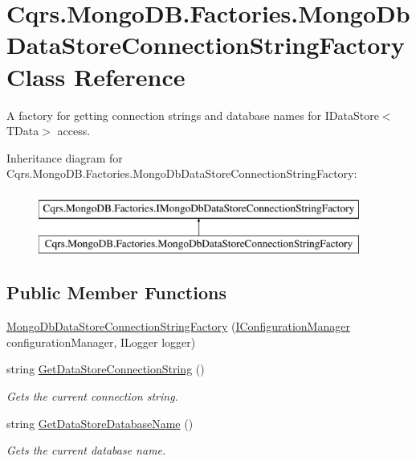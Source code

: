 \hypertarget{classCqrs_1_1MongoDB_1_1Factories_1_1MongoDbDataStoreConnectionStringFactory}{}\section{Cqrs.\+Mongo\+D\+B.\+Factories.\+Mongo\+Db\+Data\+Store\+Connection\+String\+Factory Class Reference}
\label{classCqrs_1_1MongoDB_1_1Factories_1_1MongoDbDataStoreConnectionStringFactory}


A factory for getting connection strings and database names for I\+Data\+Store$<$\+T\+Data$>$ access.  


Inheritance diagram for Cqrs.\+Mongo\+D\+B.\+Factories.\+Mongo\+Db\+Data\+Store\+Connection\+String\+Factory\+:\begin{figure}[H]
\begin{center}
\leavevmode
\includegraphics[height=2.000000cm]{classCqrs_1_1MongoDB_1_1Factories_1_1MongoDbDataStoreConnectionStringFactory}
\end{center}
\end{figure}
\subsection*{Public Member Functions}
\begin{DoxyCompactItemize}
\item 
\hyperlink{classCqrs_1_1MongoDB_1_1Factories_1_1MongoDbDataStoreConnectionStringFactory_a9ccb753772ee1aa374ad39ba5b93700f_a9ccb753772ee1aa374ad39ba5b93700f}{Mongo\+Db\+Data\+Store\+Connection\+String\+Factory} (\hyperlink{interfaceCqrs_1_1Configuration_1_1IConfigurationManager}{I\+Configuration\+Manager} configuration\+Manager, I\+Logger logger)
\item 
string \hyperlink{classCqrs_1_1MongoDB_1_1Factories_1_1MongoDbDataStoreConnectionStringFactory_a76986fcc9521c87bfbb6e417ef13cd53_a76986fcc9521c87bfbb6e417ef13cd53}{Get\+Data\+Store\+Connection\+String} ()
\begin{DoxyCompactList}\small\item\em Gets the current connection string. \end{DoxyCompactList}\item 
string \hyperlink{classCqrs_1_1MongoDB_1_1Factories_1_1MongoDbDataStoreConnectionStringFactory_ab8729212ac8fe8350dead56fc89a5fd2_ab8729212ac8fe8350dead56fc89a5fd2}{Get\+Data\+Store\+Database\+Name} ()
\begin{DoxyCompactList}\small\item\em Gets the current database name. \end{DoxyCompactList}\end{DoxyCompactItemize}

